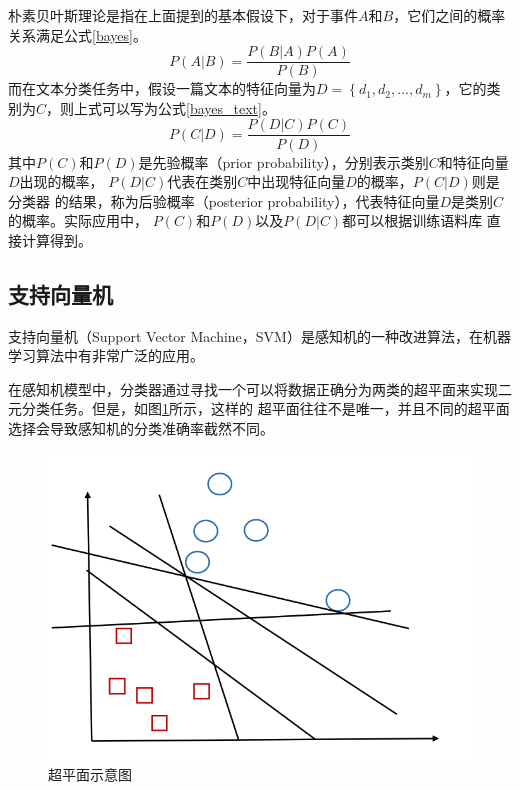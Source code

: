 朴素贝叶斯理论是指在上面提到的基本假设下，对于事件$A$和$B$，它们之间的概率关系满足公式\ref{bayes}。
\begin{equation}
    P\left ( A | B\right )=\frac{P\left ( B | A\right )P\left ( A \right )}{P\left ( B \right )}
    \label{bayes}
\end{equation}
而在文本分类任务中，假设一篇文本的特征向量为$D=\left \{ d_1,d_2,...,d_m \right \}$，它的类别为$C$，则上式可以写为公式\ref{bayes_text}。
\begin{equation}
    P\left ( C | D\right )=\frac{P\left ( D | C\right )P\left ( C \right )}{P\left ( D \right )}
    \label{bayes_text}
\end{equation}
其中$P\left ( C \right )$和$P\left ( D \right )$是先验概率（prior probability），分别表示类别$C$和特征向量$D$出现的概率，
$P\left ( D | C\right )$代表在类别$C$中出现特征向量$D$的概率，$P\left ( C | D\right )$则是分类器
的结果，称为后验概率（posterior probability），代表特征向量$D$是类别$C$的概率。实际应用中，
$P\left ( C \right )$和$P\left ( D \right )$以及$P\left ( D | C\right )$都可以根据训练语料库
直接计算得到。

\subsection{支持向量机}
支持向量机（Support Vector Machine，SVM）是感知机的一种改进算法，在机器学习算法中有非常广泛的应用。

在感知机模型中，分类器通过寻找一个可以将数据正确分为两类的超平面来实现二元分类任务。但是，如图\ref{separating_lines}所示，这样的
超平面往往不是唯一，并且不同的超平面选择会导致感知机的分类准确率截然不同。
\begin{figure}[h]
    \includegraphics[scale=0.4]{picture/separating-lines.png}
    \caption{超平面示意图}
    \label{separating_lines}
\end{figure}

